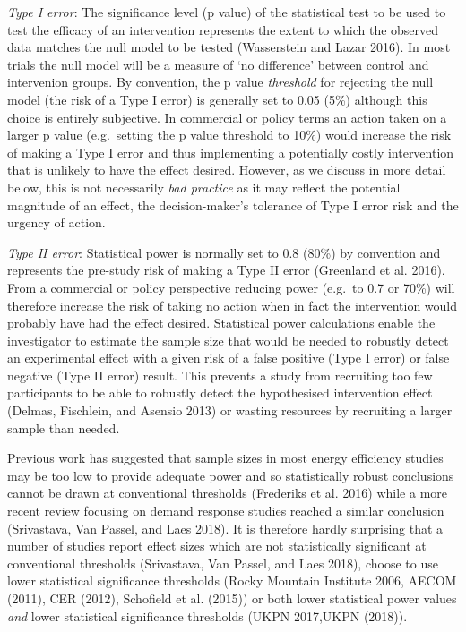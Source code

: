\documentclass[]{article}
\theoremstyle{definition}
\theoremstyle{definition}
\theoremstyle{definition}
\theoremstyle{remark}
\begin{document}
\emph{Type I error}: The significance level (p value) of the statistical
test to be used to test the efficacy of an intervention represents the
extent to which the observed data matches the null model to be tested
(Wasserstein and Lazar 2016). In most trials the null model will be a
measure of `no difference' between control and intervenion groups. By
convention, the p value \emph{threshold} for rejecting the null model
(the risk of a Type I error) is generally set to 0.05 (5\%) although
this choice is entirely subjective. In commercial or policy terms an
action taken on a larger p value (e.g.~setting the p value threshold to
10\%) would increase the risk of making a Type I error and thus
implementing a potentially costly intervention that is unlikely to have
the effect desired. However, as we discuss in more detail below, this is
not necessarily \emph{bad practice} as it may reflect the potential
magnitude of an effect, the decision-maker's tolerance of Type I error
risk and the urgency of action.

\emph{Type II error}: Statistical power is normally set to 0.8 (80\%) by
convention and represents the pre-study risk of making a Type II error
(Greenland et al. 2016). From a commercial or policy perspective
reducing power (e.g.~to 0.7 or 70\%) will therefore increase the risk of
taking no action when in fact the intervention would probably have had
the effect desired. Statistical power calculations enable the
investigator to estimate the sample size that would be needed to
robustly detect an experimental effect with a given risk of a false
positive (Type I error) or false negative (Type II error) result. This
prevents a study from recruiting too few participants to be able to
robustly detect the hypothesised intervention effect (Delmas, Fischlein,
and Asensio 2013) or wasting resources by recruiting a larger sample
than needed.

Previous work has suggested that sample sizes in most energy efficiency
studies may be too low to provide adequate power and so statistically
robust conclusions cannot be drawn at conventional thresholds (Frederiks
et al. 2016) while a more recent review focusing on demand response
studies reached a similar conclusion (Srivastava, Van Passel, and Laes
2018). It is therefore hardly surprising that a number of studies report
effect sizes which are not statistically significant at conventional
thresholds (Srivastava, Van Passel, and Laes 2018), choose to use lower
statistical significance thresholds (Rocky Mountain Institute 2006,
AECOM (2011), CER (2012), Schofield et al. (2015)) or both lower
statistical power values \emph{and} lower statistical significance
thresholds (UKPN 2017,UKPN (2018)).
\end{document}
